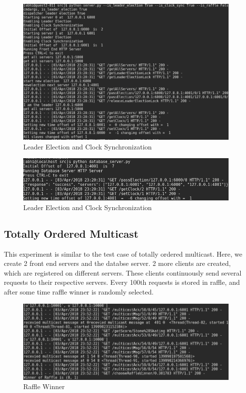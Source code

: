 \documentclass{article}
\begin{document}
\begin{figure}[H]
        \centering
        \includegraphics[width=\textwidth]{outputs/clock_sync_server.png}
        \caption{Leader Election and Clock Synchronization \label{fig:clong_synchronization}}
\end{figure}
\begin{figure}[H]
        \centering
        \includegraphics[width=\textwidth]{outputs/clock_sync_db.png}
        \caption{Leader Election and Clock Synchronization \label{fig:clong_synchronization}}
\end{figure}
\subsection{Totally Ordered Multicast}
This experiment is similar to the test case of totally ordered multicast.
Here, we create 2 front end servers and the databse server. 2 more clients
are created, which are registered on different servers. These clients
continuously send several requests to their respective servers.
Every 100th requests is stored in raffle, and after some time raffle 
winner is randomly selected.

\begin{figure}[H]
        \centering
        \includegraphics[width=\textwidth]{outputs/raffle_winner.png}
        \caption{Raffle Winner}
\end{figure}
\end{document}
